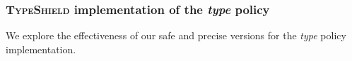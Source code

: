 \begin{table}[h!]
		\caption {The results of comparing \textit{count} safe and precision implementation throughout different optimizations.}
		\label{tbl:policycompcount}
\end{table}

\newpage

\subsubsection{\textsc{TypeShield} implementation of the \textit{type} policy}
\label{subsection:typeshieldvslimitcount}
We explore the effectiveness of our safe and precise versions for the \textit{type} policy implementation.

